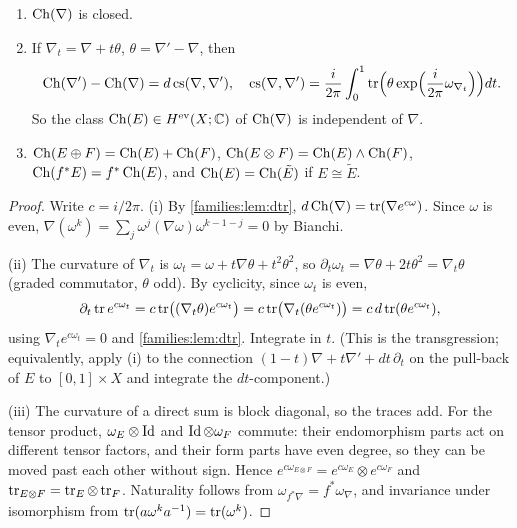 \begin{proposition}\label{families:prop:chern}
  \begin{enumerate}[label=(\roman*)]
  \item $\operatorname{Ch}(\nabla)$ is closed.
  \item If $\nabla_t=\nabla+t\theta$, $\theta=\nabla'-\nabla$, then
    \begin{equation*}
      \operatorname{Ch}(\nabla')-\operatorname{Ch}(\nabla)=d\,\mathrm{cs}(\nabla,\nabla'),\quad
      \mathrm{cs}(\nabla,\nabla')=\frac{i}{2\pi}\int_0^1\operatorname{tr}\Bigl(\theta\exp
      \Bigl(\frac{i}{2\pi}\omega_{\nabla_t}\Bigr)\Bigr)dt.
    \end{equation*}
    So the class $\operatorname{Ch}(E)\in H^{\mathrm{ev}}(X;\mathbb{C})$ of $\operatorname{Ch}(\nabla)$ is independent of
    $\nabla$.
  \item $\operatorname{Ch}(E\oplus F)=\operatorname{Ch}(E)+\operatorname{Ch}(F)$, $\operatorname{Ch}(E\otimes F)=\operatorname{Ch}(E)\wedge\operatorname{Ch}(F)$,
    $\operatorname{Ch}(f^*E)=f^*\operatorname{Ch}(E)$, and $\operatorname{Ch}(E)=\operatorname{Ch}(\tilde E)$ if $E\cong\tilde E$.
  \end{enumerate}
\end{proposition}
\begin{proof}
  Write $c=i/2\pi$. (i) By \cref{families:lem:dtr},
  $d\operatorname{Ch}(\nabla)=\operatorname{tr}(\nabla e^{c\omega})$. Since $\omega$ is even,
  $\nabla(\omega^k)=\sum_j\omega^j(\nabla\omega)\omega^{k-1-j}=0$ by Bianchi.

  (ii) The curvature of $\nabla_t$ is $\omega_t=\omega+t\nabla\theta+t^2
  \theta^2$, so $\partial_t\omega_t=\nabla\theta+2t\theta^2=\nabla_t\theta$
  (graded commutator, $\theta$ odd). By cyclicity, since $\omega_t$ is even,
  \begin{equation*}
    \partial_t\operatorname{tr} e^{c\omega_t}=c\operatorname{tr}\bigl((\nabla_t\theta)e^{c\omega_t}\bigr)
    =c\operatorname{tr}\bigl(\nabla_t(\theta e^{c\omega_t})\bigr)=c\,d\operatorname{tr}(\theta
    e^{c\omega_t}),
  \end{equation*}
  using $\nabla_te^{c\omega_t}=0$ and \cref{families:lem:dtr}. Integrate in
  $t$. (This is the transgression; equivalently, apply (i) to the connection
  $(1-t)\nabla+t\nabla'+dt\,\partial_t$ on the pull-back of $E$ to
  $[0,1]\times X$ and integrate the $dt$-component.)

  (iii) The curvature of a direct sum is block diagonal, so the traces add. For
  the tensor product, $\omega_E\otimes\operatorname{Id}$ and $\operatorname{Id}\otimes\omega_F$ commute:
  their endomorphism parts act on different tensor factors, and their form parts
  have even degree, so they can be moved past each other without sign. Hence $e^{c\omega_{E\otimes F}}=e^{c\omega_E}\otimes e^{c\omega_F}$ and
  $\operatorname{tr}_{E\otimes F}=\operatorname{tr}_E\otimes\operatorname{tr}_F$. Naturality follows from
  $\omega_{f^*\nabla}=f^*\omega_\nabla$, and invariance under isomorphism from
  $\operatorname{tr}(a\omega^ka^{-1})=\operatorname{tr}(\omega^k)$.
\end{proof}

